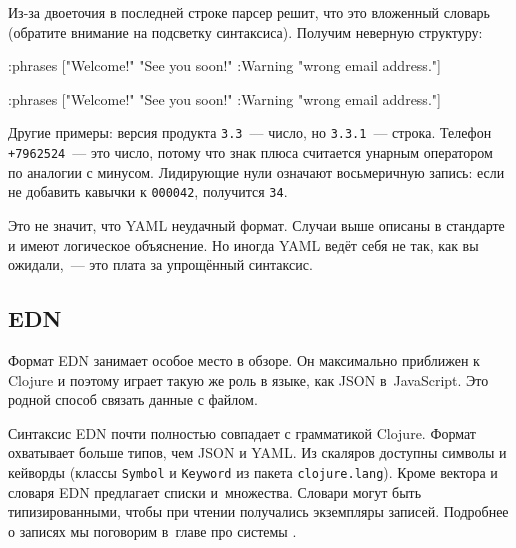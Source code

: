 Из-за двоеточия в последней строке парсер решит, что это вложенный словарь
(обратите внимание на подсветку синтаксиса). Получим неверную структуру:

\ifnarrow

\begin{english}
  \begin{clojure}
{:phrases
 ["Welcome!"
  "See you soon!"
  {:Warning "wrong email address."}]}
  \end{clojure}
\end{english}

\else

\begin{english}
  \begin{clojure}
{:phrases ["Welcome!"
           "See you soon!"
           {:Warning "wrong email address."}]}
  \end{clojure}
\end{english}

\fi

Другие примеры: версия продукта \verb|3.3|~--- число, но \verb|3.3.1|~---
строка. Телефон \texttt{+7962524}~--- это число, потому что знак плюса
считается унарным оператором по аналогии с минусом. Лидирующие нули означают
восьмеричную запись: если не добавить кавычки к \verb|000042|, получится
\verb|34|.

Это не значит, что YAML неудачный формат. Случаи выше описаны в стандарте и
имеют логическое объяснение. Но иногда YAML ведёт себя не так, как вы
ожидали,~--- это плата за упрощённый синтаксис.

\subsection{EDN}


Формат EDN занимает особое место в обзоре. Он максимально приближен к Clojure и
поэтому играет такую же роль в языке, как JSON в~JavaScript. Это родной способ
связать данные с файлом.

Синтаксис EDN почти полностью совпадает с грамматикой Clojure. Формат охватывает
больше типов, чем JSON и YAML. Из скаляров доступны символы и кейворды (классы
\verb|Symbol| и \verb|Keyword| из пакета \verb|clojure.lang|). Кроме вектора и
словаря EDN предлагает списки и~множества. Словари могут быть типизированными,
чтобы при чтении получались экземпляры записей. Подробнее о записях мы поговорим
в~главе про системы .

